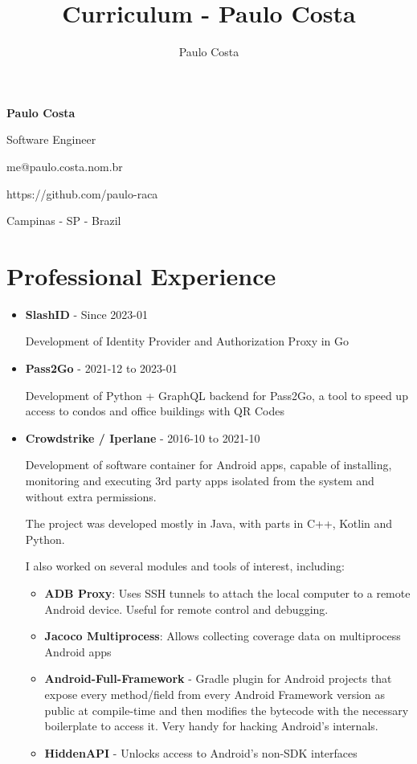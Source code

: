 \documentclass[a4paper,10pt]{article}
\title{Curriculum - Paulo Costa}
\author{Paulo Costa}
\begin{document}
  \LARGE\textbf{Paulo Costa}

  \large Software Engineer

  \large me@paulo.costa.nom.br
  
  \large https://github.com/paulo-raca


  \large Campinas - SP - Brazil

  \normalsize 
  
  \section{Professional Experience}
    \begin{itemize}
      \item
        \textbf{SlashID} - Since 2023-01

        Development of Identity Provider and Authorization Proxy in Go

      \item
        \textbf{Pass2Go} - 2021-12 to 2023-01

        Development of Python + GraphQL backend for Pass2Go, a tool to speed up access to condos and office buildings with QR Codes

      \item
        \textbf{Crowdstrike / Iperlane} - 2016-10 to 2021-10

        Development of software container for Android apps, capable of installing, monitoring and executing 3rd
        party apps isolated from the system and without extra permissions.
        
        The project was developed mostly in Java, with parts in C++, Kotlin and Python.

        I also worked on several modules and tools of interest, including:

        \begin{itemize}
          \item \textbf{ADB Proxy}: Uses SSH tunnels to attach the local computer to a remote Android device. Useful for remote control and debugging.
          \item \textbf{Jacoco Multiprocess}: Allows collecting coverage data on multiprocess Android apps
          \item \textbf{Android-Full-Framework} - Gradle plugin for Android projects that expose every method/field from every Android Framework version as public at compile-time and then modifies the bytecode with the necessary boilerplate to access it. Very handy for hacking Android's internals.
          \item \textbf{HiddenAPI} - Unlocks access to Android's non-SDK interfaces
        \end{itemize}


\end{itemize}
\end{document}
